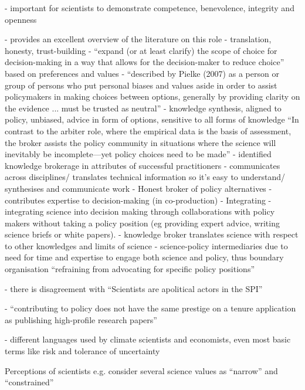 \cite{ColognaKMBMO2024} - important for scientists to demonstrate competence, benevolence, integrity and openness

\cite{DuncanRE2020} - provides an excellent overview of the literature on this role
\cite{DuncanRE2020} - translation, honesty, trust-building
\cite{Pielke2007} - ``expand (or at least clarify) the scope of choice for decision-making in a way that allows for the decision-maker to reduce choice'' based on preferences and values
\cite{GluckmanBK2021} - ``described by Pielke (2007) as a person or group of persons who put personal biases and values aside in order to assist policymakers in making choices between options, generally by providing clarity on the evidence ... must be trusted as neutral'' - knowledge synthesis, aligned to policy, unbiased, advice in form of options, sensitive to all forms of knowledge ``In contrast to the arbiter role, where the empirical data is the basis of assessment, the broker assists the policy community in situations where the science will inevitably be incomplete—yet policy choices need to be made''
\cite{GogginEtAl2015} - identified knowledge brokerage in attributes of successful practitioners - communicates across disciplines/ translates technical information so it's easy to understand/ synthesises and communicate work
\cite{RapleyD2014} - Honest broker of policy alternatives - contributes expertise to decision-making (in co-production)
\cite{SteelLLS2004,SinghTKMMC2014} - Integrating - integrating science into decision making through collaborations with policy makers without taking a policy position (eg providing expert advice, writing science briefs or white papers).
\cite{Gluckman2014} - knowledge broker translates science with respect to other knowledges and limits of science
\cite{BednarekSHG2015} - science-policy intermediaries due to need for time and expertise to engage both science and policy, thus boundary organisation ``refraining from advocating for specific policy positions''

\cite{JagannathanEtAl2023} - there is disagreement with ``Scientists are apolitical actors in the SPI''

\cite{Gerber2023} - ``contributing to policy does not have the same prestige on a tenure application as publishing high-profile research papers''

\cite{Makin2024} - different languages used by climate scientists and economists, even most basic terms like risk and tolerance of uncertainty

Perceptions of scientists e.g. \cite{McNiePS2017} consider several science values as ``narrow'' and ``constrained''


